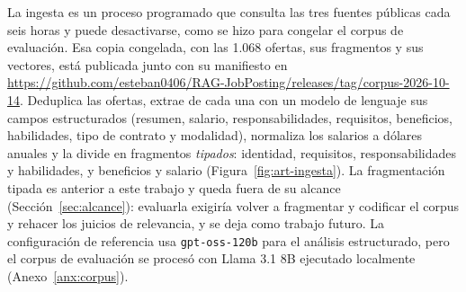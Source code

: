 \label{sec:art-ingesta}La ingesta es un proceso programado que consulta las tres fuentes públicas cada seis horas y puede desactivarse, como se hizo para congelar el corpus de evaluación. Esa copia congelada, con las 1.068 ofertas, sus fragmentos y sus vectores, está publicada junto con su manifiesto en \url{https://github.com/esteban0406/RAG-JobPosting/releases/tag/corpus-2026-10-14}. Deduplica las ofertas, extrae de cada una con un modelo de lenguaje sus campos estructurados (resumen, salario, responsabilidades, requisitos, beneficios, habilidades, tipo de contrato y modalidad), normaliza los salarios a dólares anuales y la divide en fragmentos \emph{tipados}: identidad, requisitos, responsabilidades y habilidades, y beneficios y salario (Figura~\ref{fig:art-ingesta}). La fragmentación tipada es anterior a este trabajo y queda fuera de su alcance (Sección~\ref{sec:alcance}): evaluarla exigiría volver a fragmentar y codificar el corpus y rehacer los juicios de relevancia, y se deja como trabajo futuro. La configuración de referencia usa \texttt{gpt-oss-120b} para el análisis estructurado, pero el corpus de evaluación se procesó con Llama 3.1 8B ejecutado localmente (Anexo~\ref{anx:corpus}).

